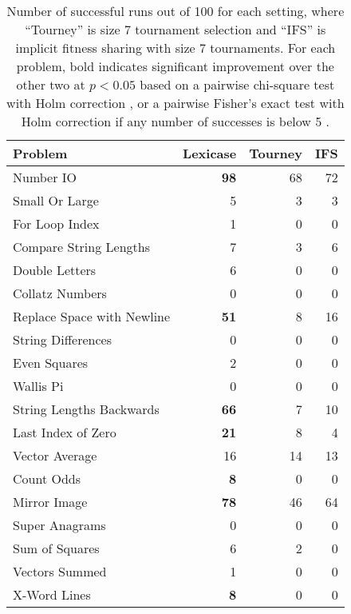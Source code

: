 \documentclass{sig-alternate}
\begin{document}
\begin{table}[t]
\centering
\caption{Number of successful runs out of 100 for each setting, where ``Tourney'' is size 7 tournament selection and ``IFS'' is implicit fitness sharing with size 7 tournaments. For each problem, bold indicates significant improvement over the other two at $p < 0.05$ based on a pairwise chi-square test with Holm correction \cite{R}, or a pairwise Fisher's exact test with Holm correction if any number of successes is below 5 \cite{fmsb}.}
\label{tableResults}
\begin{tabular}{|l|rrr|}
\hline
Problem                    & Lexicase & Tourney & IFS \\
\hline
Number IO                  & \textbf{98}       & 68      & 72  \\
Small Or Large             & 5        & 3       & 3   \\
For Loop Index             & 1        & 0       & 0   \\
Compare String Lengths     & 7        & 3       & 6   \\
Double Letters             & 6        & 0       & 0   \\ 
Collatz Numbers            & 0        & 0       & 0   \\
Replace Space with Newline & \textbf{51}       & 8       & 16  \\
String Differences         & 0        & 0       & 0   \\
Even Squares               & 2        & 0       & 0   \\
Wallis Pi                  & 0        & 0       & 0   \\
String Lengths Backwards   & \textbf{66}       & 7       & 10  \\
Last Index of Zero         & \textbf{21}       & 8       & 4   \\
Vector Average             & 16       & 14      & 13  \\
Count Odds                 & \textbf{8}        & 0       & 0   \\
Mirror Image               & \textbf{78}       & 46      & 64  \\
Super Anagrams             & 0        & 0       & 0   \\
Sum of Squares             & 6        & 2       & 0   \\
Vectors Summed             & 1        & 0       & 0   \\
X-Word Lines               & \textbf{8}        & 0       & 0   \\

\end{tabular}
\end{table}
\end{document}
